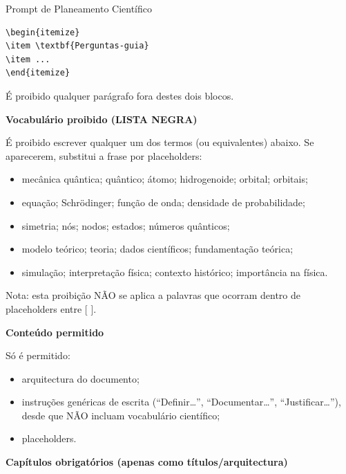 \documentclass[12pt,a4paper,twoside]{report}
\begin{document}
\begin{promptcientifico}{Prompt de Planeamento Científico}
\begin{verbatim}
\begin{itemize}
\item \textbf{Perguntas-guia}
\item ...
\end{itemize}
\end{verbatim}

É proibido qualquer parágrafo fora destes dois blocos.

\textbf{Vocabulário proibido (LISTA NEGRA)}

É proibido escrever qualquer um dos termos (ou equivalentes) abaixo.
Se aparecerem, substitui a frase por placeholders:

\begin{itemize}
\item mecânica quântica; quântico; átomo; hidrogenoide; orbital; orbitais;
\item equação; Schrödinger; função de onda; densidade de probabilidade;
\item simetria; nós; nodos; estados; números quânticos;
\item modelo teórico; teoria; dados científicos; fundamentação teórica;
\item simulação; interpretação física; contexto histórico; importância na física.
\end{itemize}

Nota: esta proibição NÃO se aplica a palavras que ocorram dentro de placeholders entre [ ].

\textbf{Conteúdo permitido}

Só é permitido:
\begin{itemize}
\item arquitectura do documento;
\item instruções genéricas de escrita (“Definir…”, “Documentar…”, “Justificar…”),
desde que NÃO incluam vocabulário científico;
\item placeholders.
\end{itemize}

\textbf{Capítulos obrigatórios (apenas como títulos/arquitectura)}


\end{promptcientifico}
\end{document}
